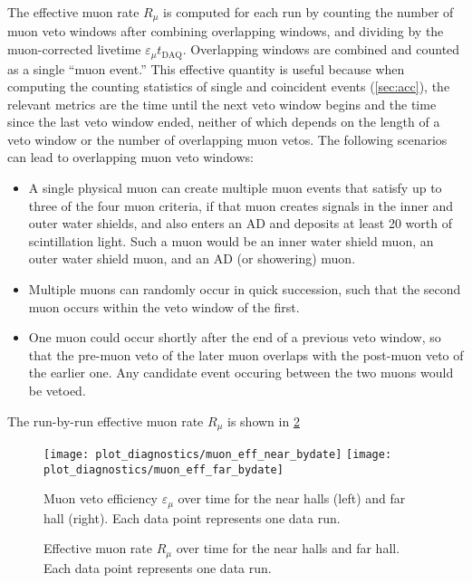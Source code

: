 The effective muon rate $R_\mu$ is computed for each run
by counting the number of muon veto windows
after combining overlapping windows, and dividing by the muon-corrected
livetime $\varepsilon_\mu t_{\text{DAQ}}$.
Overlapping windows are combined and counted as a single ``muon event.''
This effective quantity is useful
because when computing the counting statistics of single and coincident events
(\cref{sec:acc}),
the relevant metrics are the time until the next veto window begins
and the time since the last veto window ended,
neither of which depends on the length of a veto window
or the number of overlapping muon vetos.
The following scenarios can lead to overlapping muon veto windows:
\begin{itemize}
    \item A single physical muon can create multiple muon events
        that satisfy up to three of the four muon criteria,
        if that muon creates signals in the inner and outer water shields,
        and also enters an AD and deposits at least \SI{20}{\mev} worth of scintillation light.
        Such a muon would be an inner water shield muon,
        an outer water shield muon, and an AD
        (or showering) muon.
    \item Multiple muons can randomly occur in quick succession,
        such that the second muon occurs within the veto window of the first.
    \item One muon could occur shortly after the end of a previous veto window,
        so that the pre-muon veto of the later muon overlaps with the
        post-muon veto of the earlier one.
        Any candidate event occuring between the two muons would be vetoed.
\end{itemize}
The run-by-run effective muon rate $R_\mu$ is shown in \cref{fig:muon_rate}

\begin{figure}
    \texttt{[image: plot\_diagnostics/muon\_eff\_near\_bydate]}
    \texttt{[image: plot\_diagnostics/muon\_eff\_far\_bydate]}
    \caption{
        Muon veto efficiency $\varepsilon_\mu$ over time for
        the near halls (left) and far hall (right).
        Each data point represents one data run.
    }
    \label{fig:veto_eff}
\end{figure}

\begin{figure}
    \caption{
        Effective muon rate $R_\mu$ over time for the near halls and far hall.
        Each data point represents one data run.
    }
    \label{fig:muon_rate}
\end{figure}


